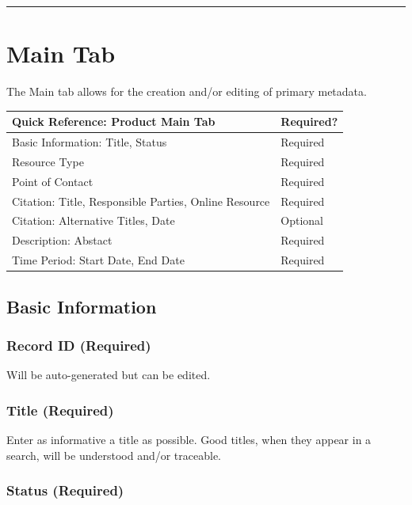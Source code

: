 \documentclass[
]{book}
\begin{document}
\begin{center}\rule{0.5\linewidth}{\linethickness}\end{center}

\hypertarget{product-main}{%
\section*{Main Tab}\label{product-main}}

The Main tab allows for the creation and/or editing of primary metadata.

\begin{longtable}[]{@{}ll@{}}
\toprule
Quick Reference: Product Main Tab & Required?\tabularnewline
\midrule
\endhead
Basic Information: Title, Status & Required\tabularnewline
Resource Type & Required\tabularnewline
Point of Contact & Required\tabularnewline
Citation: Title, Responsible Parties, Online Resource & Required\tabularnewline
Citation: Alternative Titles, Date & Optional\tabularnewline
Description: Abstact & Required\tabularnewline
Time Period: Start Date, End Date & Required\tabularnewline
\bottomrule
\end{longtable}

\hypertarget{basic-information-2}{%
\subsection*{Basic Information}\label{basic-information-2}}

\hypertarget{record-id-required}{%
\subsubsection*{Record ID (Required)}\label{record-id-required}}

Will be auto-generated but can be edited.

\hypertarget{title-required-1}{%
\subsubsection*{Title (Required)}\label{title-required-1}}

Enter as informative a title as possible. Good titles, when they appear in a search, will be understood and/or traceable.

\hypertarget{status-required-1}{%
\subsubsection*{Status (Required)}\label{status-required-1}}
\end{document}
